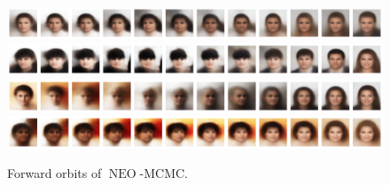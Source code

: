 \documentclass{article}
\def\IFIS{\ensuremath{\operatorname{NEO}}}
\def\NEO{{\small \IFIS}}
\newcommand{\1}{\mathds{1}}
\begin{document}
 \begin{figure}
     \centering
\includegraphics[width = .99\linewidth]{celeba_inpainting_neo_orbit1.pdf}
\includegraphics[width = .99\linewidth]{celeba_inpainting_neo_orbit2.pdf}
\includegraphics[width = .99\linewidth]{celeba_inpainting_neo_orbit3.pdf}
\includegraphics[width = .99\linewidth]{celeba_inpainting_neo_orbit_4.pdf}
     \caption{Forward orbits of \NEO-MCMC.}
     \label{fig:gibbs_inpainting}
 \end{figure}
\end{document}
